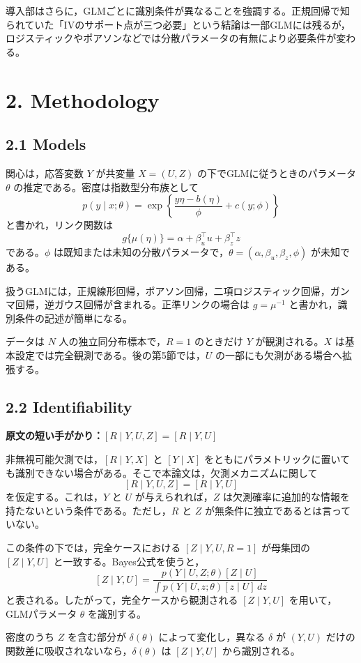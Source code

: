 \documentclass[dvipdfmx,autodetect-engine]{jsarticle}
\newcommand{\cue}[1]{\par\smallskip\noindent\textbf{原文の短い手がかり：}#1\par\smallskip}
\begin{document}
導入部はさらに，GLMごとに識別条件が異なることを強調する。正規回帰で知られていた「IVのサポート点が三つ必要」という結論は一部GLMには残るが，ロジスティックやポアソンなどでは分散パラメータの有無により必要条件が変わる。

\section{2. Methodology}

\subsection{2.1 Models}

関心は，応答変数 $Y$ が共変量 $X=(U,Z)$ の下でGLMに従うときのパラメータ $\theta$ の推定である。密度は指数型分布族として
\[
p(y\mid x;\theta)=\exp\left\{\frac{y\eta-b(\eta)}{\phi}+c(y;\phi)\right\}
\]
と書かれ，リンク関数は
\[
g\{\mu(\eta)\}=\alpha+\beta_u^\top u+\beta_z^\top z
\]
である。$\phi$ は既知または未知の分散パラメータで，$\theta=(\alpha,\beta_u,\beta_z,\phi)$ が未知である。

扱うGLMには，正規線形回帰，ポアソン回帰，二項ロジスティック回帰，ガンマ回帰，逆ガウス回帰が含まれる。正準リンクの場合は $g=\mu^{-1}$ と書かれ，識別条件の記述が簡単になる。

データは $N$ 人の独立同分布標本で，$R=1$ のときだけ $Y$ が観測される。$X$ は基本設定では完全観測である。後の第5節では，$U$ の一部にも欠測がある場合へ拡張する。

\subsection{2.2 Identifiability}

\cue{$[R\mid Y,U,Z]=[R\mid Y,U]$}

非無視可能欠測では，$[R\mid Y,X]$ と $[Y\mid X]$ をともにパラメトリックに置いても識別できない場合がある。そこで本論文は，欠測メカニズムに関して
\[
[R\mid Y,U,Z]=[R\mid Y,U]
\]
を仮定する。これは，$Y$ と $U$ が与えられれば，$Z$ は欠測確率に追加的な情報を持たないという条件である。ただし，$R$ と $Z$ が無条件に独立であるとは言っていない。

この条件の下では，完全ケースにおける $[Z\mid Y,U,R=1]$ が母集団の $[Z\mid Y,U]$ と一致する。Bayes公式を使うと，
\[
[Z\mid Y,U]
=
\frac{p(Y\mid U,Z;\theta)[Z\mid U]}
{\int p(Y\mid U,z;\theta)[z\mid U]\,dz}
\]
と表される。したがって，完全ケースから観測される $[Z\mid Y,U]$ を用いて，GLMパラメータ $\theta$ を識別する。

\begin{description}[leftmargin=3.2em]
\item[Lemma 1] 密度のうち $Z$ を含む部分が $\delta(\theta)$ によって変化し，異なる $\delta$ が $(Y,U)$ だけの関数差に吸収されないなら，$\delta(\theta)$ は $[Z\mid Y,U]$ から識別される。
\end{description}
\end{document}
